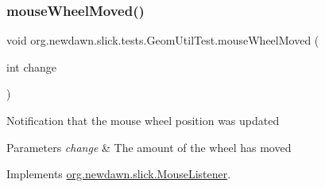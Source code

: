 \subsubsection{\texorpdfstring{mouse\+Wheel\+Moved()}{mouseWheelMoved()}}
{\footnotesize\ttfamily void org.\+newdawn.\+slick.\+tests.\+Geom\+Util\+Test.\+mouse\+Wheel\+Moved (\begin{DoxyParamCaption}\item[{int}]{change }\end{DoxyParamCaption})\hspace{0.3cm}{\ttfamily [inline]}}

Notification that the mouse wheel position was updated


\begin{DoxyParams}{Parameters}
{\em change} & The amount of the wheel has moved \\
\hline
\end{DoxyParams}


Implements \mbox{\hyperlink{interfaceorg_1_1newdawn_1_1slick_1_1_mouse_listener_ad7e49c969e1f0315ecdf238f715953d1}{org.\+newdawn.\+slick.\+Mouse\+Listener}}.


